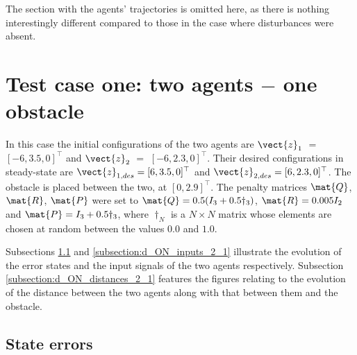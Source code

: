 The section with the agents' trajectories is omitted here, as
there is nothing interestingly different compared to those
in the case where disturbances were absent.

\section{Test case one: two agents $-$ one obstacle}

In this case the initial configurations of the two agents are
$\vect{z}_1$ $=$ $[-6, 3.5, 0]^{\top}$ and
$\vect{z}_2$ $=$ $[-6, 2.3, 0]^{\top}$.
Their desired configurations in steady-state are
$\vect{z}_{1,des} = [6, 3.5, 0]^{\top}$ and
$\vect{z}_{2,des} = [6, 2.3, 0]^{\top}$.
The obstacle is placed between the two, at $[0, 2.9]^{\top}$. The penalty
matrices $\mat{Q}$, $\mat{R}$, $\mat{P}$ were set to
$\mat{Q} = 0.5 (I_3 + 0.5 \dagger_3)$, $\mat{R} = 0.005 I_2$ and
$\mat{P} = I_3 + 0.5 \dagger_3$, where $\dagger_N$ is a $N \times N$ matrix whose
elements are chosen at random between the values $0.0$ and $1.0$.

Subsections \ref{subsection:d_ON_errors_2_1} and \ref{subsection:d_ON_inputs_2_1}
illustrate the evolution of the error states and the input signals of the two agents
respectively. Subsection \ref{subsection:d_ON_distances_2_1} features the
figures relating to the evolution of the distance between the two agents
along with that between them and the obstacle.

\subsection{State errors}
\label{subsection:d_ON_errors_2_1}

\noindent{}


